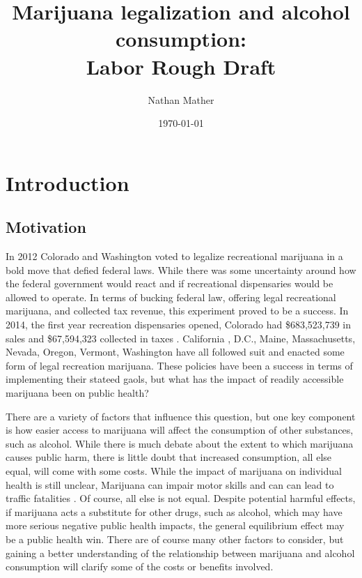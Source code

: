 \documentclass[11pt]{article}
\title{Marijuana legalization and alcohol consumption:\\
	Labor Rough Draft} %
\author{Nathan Mather} %
\date{\today} %
\begin{document}
	
	
\maketitle %

\setcounter{tocdepth}{3} %

\tableofcontents %

\section{Introduction}

\subsection{Motivation}

In 2012 Colorado and Washington voted to legalize recreational marijuana in a bold move that defied federal laws.  While there was some uncertainty around how the federal government would react and if recreational dispensaries would be allowed to operate. In terms of bucking federal law, offering legal recreational marijuana, and collected tax revenue, this experiment proved to be a success. In 2014, the first year recreation dispensaries opened, Colorado had \$683,523,739 in sales and \$67,594,323 collected in taxes \cite{Colorado_marijuana_sales}. California , D.C., Maine, Massachusetts, Nevada, Oregon, Vermont, Washington have all followed suit and enacted some form of legal recreation marijuana. These policies have been a success in terms of implementing their stateed gaols, but what has the impact of readily accessible marijuana been on public health? \par

There are a variety of factors that influence this question, but one key component is how easier access to marijuana will affect the consumption of other substances, such as alcohol. While there is much debate about the extent to which marijuana causes public harm, there is little doubt that increased consumption, all else equal, will come with some costs. While the impact of marijuana on individual health is still unclear, Marijuana can impair motor skills and can can lead to traffic fatalities \cite{webmd_mj}. Of course, all else is not equal.  Despite potential harmful effects, if marijuana acts a substitute for other drugs, such as alcohol, which may have more serious negative public health impacts, the general equilibrium effect may be a public health win. There are of course many other factors to consider, but gaining a  better understanding of the relationship between marijuana and alcohol consumption will clarify some of the costs or benefits involved. 
\end{document}
